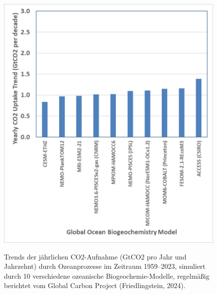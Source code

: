 \documentclass[12pt,paper=a4,DIV=12,parskip=never,chapterprefix=false,headings=standardclasses]{scrreprt}
\begin{document}
\begin{figure}[H]
\begin{center}
\includegraphics[width=1.0\textwidth]{bilder/bilderKlima-0015.png}\\[1cm]
\end{center}
\caption{Trends der jährlichen CO2-Aufnahme (GtCO2 pro Jahr und Jahrzehnt) durch Ozeanprozesse im Zeitraum
1959–2023, simuliert durch 10 verschiedene ozeanische Biogeochemie-Modelle, regelmäßig berichtet vom
Global Carbon Project (Friedlingstein, 2024).}
\end{figure}
\end{document}
